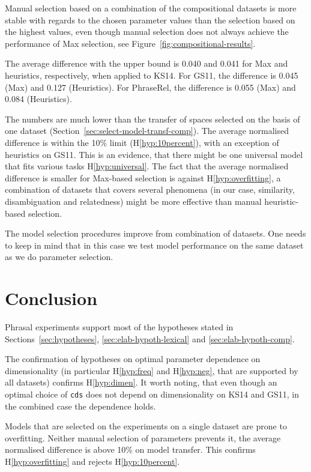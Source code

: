 Manual selection based on a combination of the compositional datasets is more stable with regards to the chosen parameter values than the selection based on the highest values, even though manual selection does not always achieve the performance of Max selection, see Figure~\ref{fig:compositional-results}.

The average difference with the upper bound is 0.040 and 0.041 for Max and heuristics, respectively, when applied to KS14. For GS11, the difference is 0.045 (Max) and 0.127 (Heuristics). For PhraseRel, the difference is 0.055 (Max) and 0.084 (Heuristics).

The numbers are much lower than the transfer of spaces selected on the basis of one dataset (Section~\ref{sec:select-model-transf-comp}). The average normalised difference is within the 10\% limit (H\ref{hyp:10percent}), with an exception of heuristics on GS11. This is an evidence, that there might be one universal model that fits various tasks H\ref{hyp:universal}. The fact that the average normalised difference is smaller for Max-based selection is against H\ref{hyp:overfitting}, a combination of datasets that covers several phenomena (in our case, similarity, disambiguation and relatedness) might be more effective than manual heuristic-based selection.

The model selection procedures improve from combination of datasets. One needs to keep in mind that in this case we test model performance on the same dataset as we do parameter selection.

\section{Conclusion}
\label{sec:conclusion-comp}

Phrasal experiments support most of the hypotheses stated in
Sections~\ref{sec:hypotheses}, \ref{sec:elab-hypoth-lexical} and
\ref{sec:elab-hypoth-comp}.

The confirmation of hypotheses on optimal parameter dependence on dimensionality (in particular H\ref{hyp:freq} and H\ref{hyp:neg}, that are supported by all datasets) confirms H\ref{hyp:dimen}. It worth noting, that even though an optimal choice of \texttt{cds} does not depend on dimensionality on KS14 and GS11, in the combined case the dependence holds.

Models that are selected on the experiments on a single dataset are prone to overfitting. Neither manual selection of parameters prevents it, the average normalised difference is above 10\% on model transfer. This confirms H\ref{hyp:overfitting} and rejects H\ref{hyp:10percent}.


